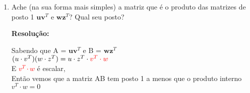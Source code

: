 \documentclass[leqno]{article}
\numberwithin{equation}{section}
\newcommand{\bfw}{\mathbf{w}}
\newcommand{\bfv}{\mathbf{v}}
\newcommand{\bfu}{\mathbf{u}}
\newcommand{\bfz}{\mathbf{z}}
\newenvironment{sol}
{
	\vspace{4mm}
	\noindent\textbf{Resolução:}
	\strut\newline
	\smallskip
	\hspace{-3.5mm}
}
{}
\begin{document}
\begin{enumerate}
\begin{sol}
			-----------------------------------------------------------------------------------------------------\\
			\vspace{0.2cm}
			Uma base para a interseção desse plano com o plano xy:\\
			\vspace{0.2cm}
			z = 0, então agora:\\
			\vspace{0.2cm}
			$P = \{(x, y) / x - 2y = 0\}$\\
			\vspace{0.2cm}
			Por isso, $x = 2y$\\
			\vspace{0.2cm}
			$P = \{y (2, 1, 0) / y \in R\}$\\
			$$\begin{bmatrix} 
				2  \\
				1  \\
				0 \end{bmatrix}$$
			-----------------------------------------------------------------------------------------------------\\
			\vspace{0.2cm}
			Por último, uma base para todos os vetores perpendiculares a esse plano:\\
			\vspace{0.2cm}
			Usamos a normal N = (1, -2, 3) como base.\\
			$$\begin{bmatrix} 
				1  \\
				-2 \\
				3 \end{bmatrix}$$
			
		\end{sol} 
		
		\item Ache (na sua forma mais simples) a matriz que é o produto das matrizes de posto 1 $\bfu \bfv^T$ e $\bfw \bfz^T$? Qual seu posto?
		
		\begin{sol} 
			Sabendo que A = $\bfu \bfv^T$ e B = $\bfw \bfz^T$\\
			$(u \cdot v^T)(w \cdot z^T) = u \cdot z^T \cdot \textcolor{red}{v^T \cdot w}$\\
			E \textcolor{red}{$v^T \cdot w$} é escalar,\\
			Então vemos que a matriz AB tem posto 1 a menos que o produto interno $v^T \cdot w = 0$ 
		\end{sol} 
		

\end{enumerate}
\end{document}
